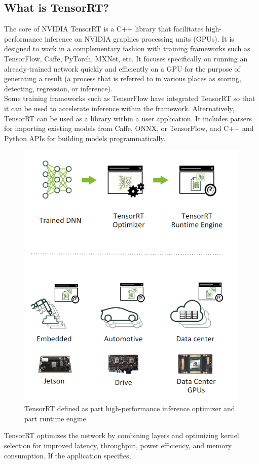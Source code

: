     \subsection{What is TensorRT?}
        The core of NVIDIA \textregistered TensorRT \texttrademark is a C++ library that facilitates high-performance inference on NVIDIA graphics processing units (GPUs). 
        It is designed to work in a complementary fashion with training frameworks such as TensorFlow, Caffe, PyTorch, MXNet, etc. It focuses specifically on running an already-trained network quickly and 
        efficiently on a GPU for the purpose of generating a result (a process that is referred to in various places as scoring, detecting, regression, or inference). \\ 
        \vspace{3mm}
        Some training frameworks such as TensorFlow have integrated TensorRT so that it can be used to accelerate inference within the framework. Alternatively, TensorRT can be used as a library within a user application. 
        It includes parsers for importing existing models from Caffe, ONNX, or TensorFlow, and C++ and Python APIs for building models programmatically.
        \begin{figure}[H]
            \centering
            \includegraphics[width=0.6\linewidth]{img/high-performance.png}
            \caption{TensorRT defined as part high-performance inference optimizer and part runtime engine}
        \end{figure}
        TensorRT optimizes the network by combining layers and optimizing kernel selection for improved latency, throughput, power efficiency, and memory consumption. If the application specifies, 
